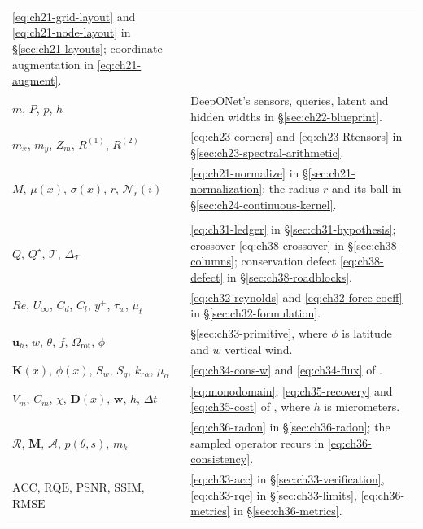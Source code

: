 {\begin{xltabular}{\textwidth}{@{}l >{\raggedright\arraybackslash}X@{}}
\eqref{eq:ch21-grid-layout} and \eqref{eq:ch21-node-layout} in \S\ref{sec:ch21-layouts};
coordinate augmentation in \eqref{eq:ch21-augment}. \\
$m$, $P$, $p$, $h$ & DeepONet's sensors, queries, latent and hidden widths in
\S\ref{sec:ch22-blueprint}. \\
$m_x$, $m_y$, $Z_m$, $R^{(1)}$, $R^{(2)}$ & \eqref{eq:ch23-corners} and
\eqref{eq:ch23-Rtensors} in \S\ref{sec:ch23-spectral-arithmetic}. \\
$M$, $\mu(x)$, $\sigma(x)$, $r$, $\mathcal{N}_r(i)$ & \eqref{eq:ch21-normalize} in
\S\ref{sec:ch21-normalization}; the radius $r$ and its ball in
\S\ref{sec:ch24-continuous-kernel}. \\
\addlinespace
{}\\
\addlinespace
$Q$, $Q^{\star}$, $\mathcal{T}$, $\Delta_{\mathcal{T}}$ & \eqref{eq:ch31-ledger} in
\S\ref{sec:ch31-hypothesis}; crossover \eqref{eq:ch38-crossover} in \S\ref{sec:ch38-columns};
conservation defect \eqref{eq:ch38-defect} in \S\ref{sec:ch38-roadblocks}. \\
$Re$, $U_\infty$, $C_d$, $C_l$, $y^{+}$, $\tau_w$, $\mu_t$ & \eqref{eq:ch32-reynolds} and
\eqref{eq:ch32-force-coeff} in \S\ref{sec:ch32-formulation}. \\
$\mathbf{u}_h$, $w$, $\theta$, $f$, $\Omega_{\mathrm{rot}}$, $\phi$ &
\S\ref{sec:ch33-primitive}, where $\phi$ is latitude and $w$ vertical wind. \\
$\mathbf{K}(x)$, $\phi(x)$, $S_w$, $S_g$, $k_{r\alpha}$, $\mu_\alpha$ &
\eqref{eq:ch34-cons-w} and \eqref{eq:ch34-flux} of
. \\
$V_m$, $C_m$, $\chi$, $\mathbf{D}(x)$, $\mathbf{w}$, $h$, $\Delta t$ & \eqref{eq:monodomain},
\eqref{eq:ch35-recovery} and \eqref{eq:ch35-cost} of
, where $h$ is micrometers. \\
$\mathcal{R}$, $\mathbf{M}$, $\mathcal{A}$, $p(\theta,s)$, $m_k$ & \eqref{eq:ch36-radon} in
\S\ref{sec:ch36-radon}; the sampled operator recurs in \eqref{eq:ch36-consistency}. \\
$\mathrm{ACC}$, $\mathrm{RQE}$, $\mathrm{PSNR}$, $\mathrm{SSIM}$, $\mathrm{RMSE}$ &
\eqref{eq:ch33-acc} in \S\ref{sec:ch33-verification}, \eqref{eq:ch33-rqe} in
\S\ref{sec:ch33-limits}, \eqref{eq:ch36-metrics} in \S\ref{sec:ch36-metrics}. \\
\end{xltabular}
}

